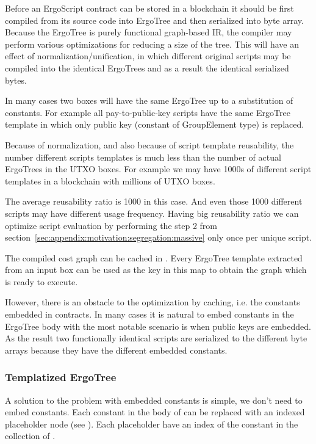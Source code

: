 Before an ErgoScript contract can be stored in a blockchain it should be first compiled
from its source code into ErgoTree and then serialized into byte array. Because the
ErgoTree is purely functional graph-based IR, the compiler may perform various
optimizations for reducing a size of the tree. This will have an effect of
normalization/unification, in which different original scripts may be compiled into the
identical ErgoTrees and as a result the identical serialized bytes.

In many cases two boxes will have the same ErgoTree up to a substitution of constants. 
For example all pay-to-public-key scripts have the same ErgoTree template in which only 
public key (constant of GroupElement type) is replaced. 

Because of normalization, and also because of script template reusability, the number
different scripts templates is much less than the number
of actual ErgoTrees in the UTXO boxes. For example we may have 1000s of
different script templates in a blockchain with millions of UTXO boxes.

The average reusability ratio is 1000 in this case. And even those 1000 different
scripts may have different usage frequency. Having big reusability ratio we can
optimize script evaluation by performing the step 2 from
section~\ref{sec:appendix:motivation:segregation:massive} only once per unique script.

The compiled cost graph can be cached in . Every ErgoTree template extracted from an input box can be used as the key
in this map to obtain the graph which is ready to execute.

However, there is an obstacle to the optimization by caching, i.e. the constants
embedded in contracts. In many cases it is natural to
embed constants in the ErgoTree body with the most notable scenario is when public keys
are embedded. As the result two functionally identical scripts are serialized to
the different byte arrays because they have the different embedded constants.

\subsubsection{Templatized ErgoTree}

A solution to the problem with embedded constants is simple, we don't need to embed
constants. Each constant in the body of \ASDag can be replaced with an indexed
placeholder node (see
\hyperref[sec:appendix:primops:ConstantPlaceholder]{}). Each
placeholder have an index of the constant in the  collection of
. 

